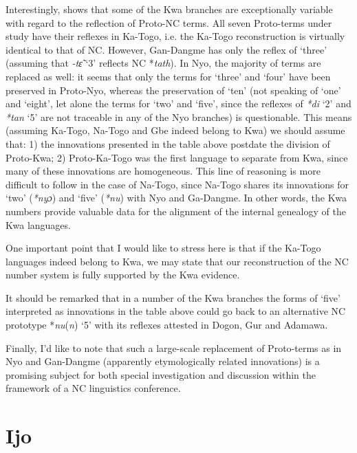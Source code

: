 Interestingly,  shows that some of the Kwa branches are exceptionally variable with regard to the reflection of Proto-NC terms. All seven Proto-terms under study have their reflexes in Ka-Togo, i.e. the Ka-Togo reconstruction is virtually identical to that of NC. However, Gan-Dangme has only the reflex of ‘three’ (assuming that \textit{-t{\~{ɛ}}} ‘3’ reflects NC *\textit{tath}). In Nyo, the majority of terms are replaced as well: it seems that only the terms for ‘three’ and ‘four’ have been preserved in Proto-Nyo, whereas the preservation of ‘ten’ (not speaking of ‘one’ and ‘eight’, let alone the terms for ‘two’ and ‘five’, since the reflexes of \textit{*di} ‘2’ and \textit{*tan} ‘5’ are not traceable in any of the Nyo branches) is questionable. This means (assuming Ka-Togo, Na-Togo and Gbe indeed belong to Kwa) we should assume that: 1) the innovations presented in the table above postdate the division of Proto-Kwa; 2) Proto-Ka-Togo was the first language to separate from Kwa, since many of these innovations are homogeneous. This line of reasoning is more difficult to follow in the case of Na-Togo, since Na-Togo shares its innovations for ‘two’ (\textit{*ny}\textit{ɔ}) and ‘five’ (\textit{*nu}) with Nyo and Ga-Dangme. In other words, the Kwa numbers provide valuable data for the alignment of the internal genealogy of the Kwa languages.

One important point that I would like to stress here is that if the Ka-Togo languages indeed belong to Kwa, we may state that our reconstruction of the NC number system is fully supported by the Kwa evidence.  

It should be remarked that in a number of the Kwa branches the forms of ‘five’ interpreted as innovations in the table above could go back to an alternative NC prototype *\textit{nu}(\textit{n}) ‘5’ with its reflexes attested in Dogon, Gur and Adamawa.

Finally, I’d like to note that such a large-scale replacement of Proto-terms as in Nyo and Gan-Dangme (apparently etymologically related innovations) is a promising subject for both special investigation and discussion within the framework of a NC linguistics conference.

\clearpage
\section{Ijo}%

